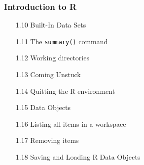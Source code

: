 \documentclass{beamer}
\begin{document}
 	\begin{frame}
 		\frametitle{Introduction to R}
 		\begin{itemize}
 			\item[1.10] Built-In Data Sets      
 			\item[1.11] The \texttt{summary()} command     
 			\item[1.12] Working directories      
 			\item[1.13] Coming Unstuck    
 			\item[1.14] Quitting the R environment   
 			\item[1.15] Data Objects  
 			\item[1.16] Listing all items in a workspace     
 			\item[1.17] Removing items   
 			\item[1.18] Saving and Loading R Data Objects    
 		\end{itemize}
 	\end{frame}
 	
\end{document}
